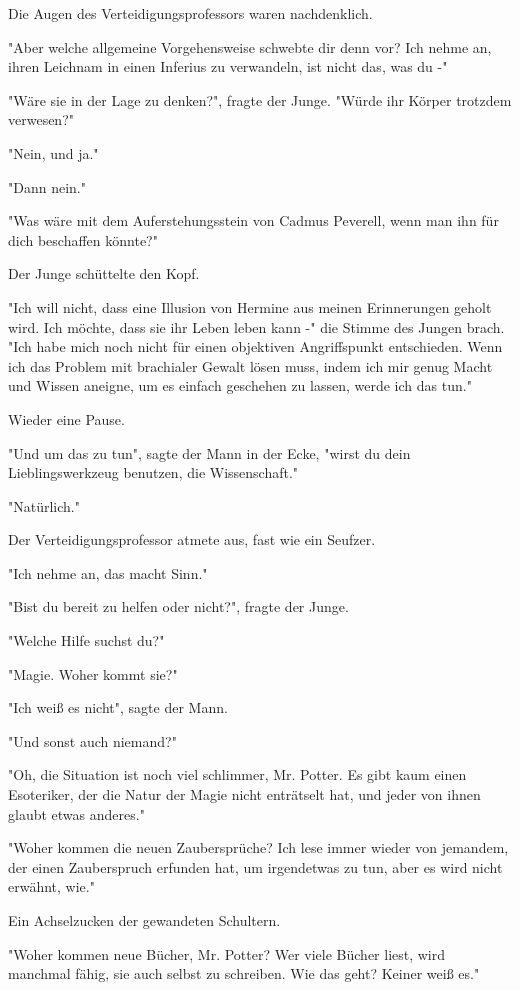 {Die Augen des Verteidigungsprofessors waren nachdenklich.

"Aber welche allgemeine Vorgehensweise schwebte dir denn vor? Ich nehme an, ihren Leichnam in einen Inferius zu verwandeln, ist nicht das, was du -"

"Wäre sie in der Lage zu denken?", fragte der Junge. "Würde ihr Körper trotzdem verwesen?"

"Nein, und ja."

"Dann nein."

"Was wäre mit dem Auferstehungsstein von Cadmus Peverell, wenn man ihn für dich beschaffen könnte?"

Der Junge schüttelte den Kopf.

"Ich will nicht, dass eine Illusion von Hermine aus meinen Erinnerungen geholt wird. Ich möchte, dass sie ihr Leben leben kann -" die Stimme des Jungen brach. "Ich habe mich noch nicht für einen objektiven Angriffspunkt entschieden. Wenn ich das Problem mit brachialer Gewalt lösen muss, indem ich mir genug Macht und Wissen aneigne, um es einfach geschehen zu lassen, werde ich das tun."

Wieder eine Pause.

"Und um das zu tun", sagte der Mann in der Ecke, "wirst du dein Lieblingswerkzeug benutzen, die Wissenschaft."

"Natürlich."

Der Verteidigungsprofessor atmete aus, fast wie ein Seufzer.

"Ich nehme an, das macht Sinn."

"Bist du bereit zu helfen oder nicht?", fragte der Junge.

"Welche Hilfe suchst du?"

"Magie. Woher kommt sie?"

"Ich weiß es nicht", sagte der Mann.

"Und sonst auch niemand?"

"Oh, die Situation ist noch viel schlimmer, Mr. Potter. Es gibt kaum einen Esoteriker, der die Natur der Magie nicht enträtselt hat, und jeder von ihnen glaubt etwas anderes."

"Woher kommen die neuen Zaubersprüche? Ich lese immer wieder von jemandem, der einen Zauberspruch erfunden hat, um irgendetwas zu tun, aber es wird nicht erwähnt, wie."

Ein Achselzucken der gewandeten Schultern.

"Woher kommen neue Bücher, Mr. Potter? Wer viele Bücher liest, wird manchmal fähig, sie auch selbst zu schreiben. Wie das geht? Keiner weiß es."

}
